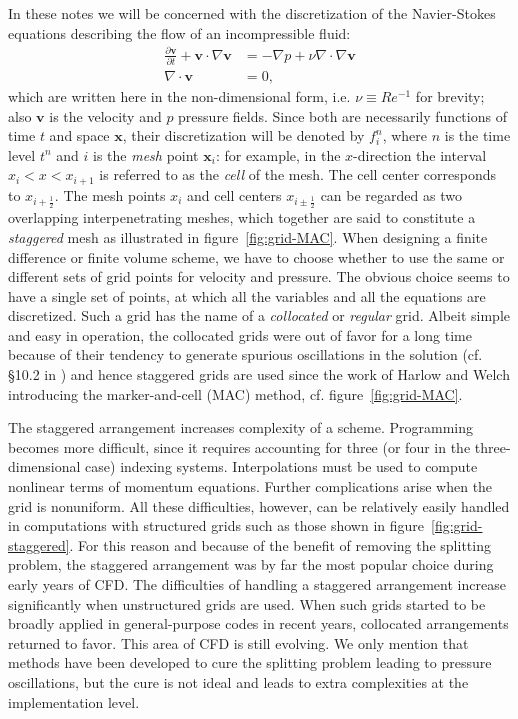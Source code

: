 \documentclass{article}
\begin{document}
In these notes we will be concerned with the discretization of the Navier-Stokes equations describing the flow of an incompressible fluid:
\begin{subequations}
\label{eqs:NSE}
\begin{align}
\label{eqn:momentum}
\frac{\partial \boldsymbol{v}}{\partial t} + \boldsymbol{v} \cdot \nabla \boldsymbol{v} &= -\nabla p + \nu \nabla \cdot \nabla \boldsymbol{v} \\
\label{eqn:continuity}
\nabla \cdot \boldsymbol{v} &= 0,
\end{align}
\end{subequations}
which are written here in the non-dimensional form, i.e. $\nu \equiv Re^{-1}$ for brevity; also $\boldsymbol{v}$ is the velocity and $p$ pressure fields. Since both are necessarily functions of time $t$ and space $\boldsymbol{x}$, their discretization will be denoted by $f^{n}_{i}$, where $n$ is the time level $t^{n}$ and $i$ is the \textit{mesh} point $\boldsymbol{x}_{i}$: for example, in the $x$-direction the interval $x_{i} < x < x_{i+1}$ is referred to as the \textit{cell} of the mesh. The cell center corresponds to $x_{i+\frac{1}{2}}$. The mesh points $x_{i}$ and cell centers $x_{i \pm \frac{1}{2}}$ can be regarded as two overlapping interpenetrating meshes, which together are said to constitute a \textit{staggered} mesh as illustrated in figure~\ref{fig:grid-MAC}. When designing a finite difference or finite volume scheme, we have to choose whether to use the same or different sets of grid points for velocity and pressure. The obvious choice seems to have a single set of points, at which all the variables and all the equations are discretized. Such a grid
has the name of a \textit{collocated} or \textit{regular} grid. Albeit simple and easy in operation, the collocated grids were out of favor for a long time because of their tendency to generate spurious oscillations in the solution (cf. \S 10.2 in \cite{Zikanov:2010}) and hence staggered grids are used since the work of Harlow and Welch \cite{Harlow:1965} introducing the marker-and-cell (MAC) method, cf. figure~\ref{fig:grid-MAC}.

The staggered arrangement increases complexity of a scheme. Programming becomes more difficult, since it requires accounting for three (or four in the three-dimensional case) indexing systems. Interpolations must be used to compute nonlinear terms of momentum equations. Further complications arise when the grid is nonuniform. All these difficulties, however, can be relatively easily handled in computations with structured grids such as those shown in figure~\ref{fig:grid-staggered}. For this reason and because of the benefit of removing the splitting problem, the staggered arrangement was by far the most popular choice during early years of CFD. The difficulties of handling a staggered arrangement increase significantly when unstructured grids are used. When such grids started to
be broadly applied in general-purpose codes in recent years, collocated arrangements returned to favor. This area of CFD is still evolving. We only mention that methods have been developed to cure the splitting problem leading to pressure oscillations, but the cure is not ideal and leads to extra complexities at the implementation level.
\end{document}
